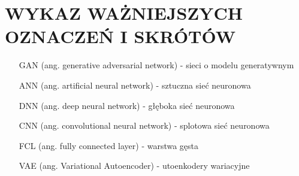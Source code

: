 \section*{WYKAZ WAŻNIEJSZYCH OZNACZEŃ I SKRÓTÓW}

  \bigskip

  \begin{itemize}
    \item[GAN] (ang. generative adversarial network) - sieci o modelu generatywnym
    \item[ANN] (ang. artificial neural network) - sztuczna sieć neuronowa
    \item[DNN] (ang. deep neural network) - głęboka sieć neuronowa
    \item[CNN] (ang. convolutional neural network) - splotowa sieć neuronowa
    \item[FCL] (ang. fully connected layer) - warstwa gęsta
    \item[VAE] (ang. Variational Autoencoder) - utoenkodery wariacyjne
  \end{itemize}

